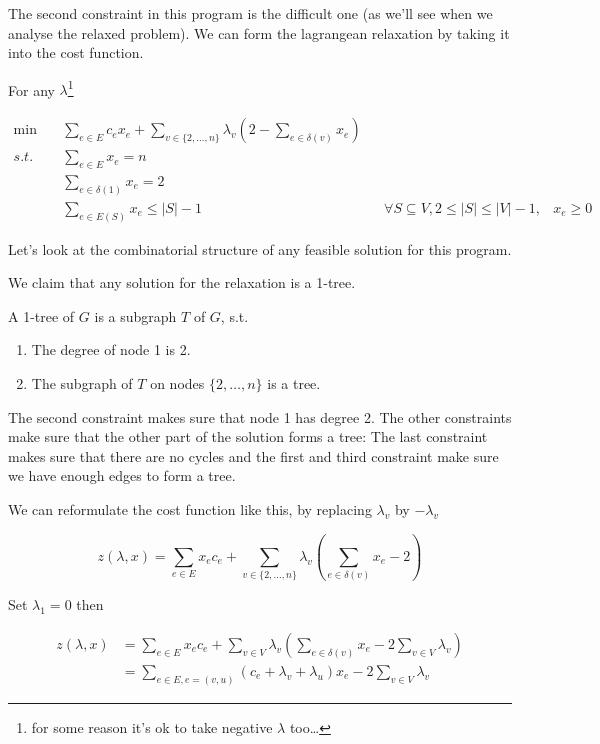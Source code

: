 The second constraint in this program is the difficult one (as we'll see when we analyse the relaxed problem). We can form the lagrangean relaxation by taking it into the cost function.

For any $\lambda$\footnote{for some reason it's ok to take negative $\lambda$ too\ldots}

\begin{align*}
\min \quad & \sum_{e\in E} c_e x_e + \sum_{v\in \{2,\ldots,n\}} \lambda_v(2-\sum_{e\in \delta(v)} x_e)\\
s.t. \quad & \sum_{e\in E} x_e = n\\
	&\sum_{e\in \delta(1)} x_e=2\\
	&\sum_{e\in E(S)} x_e \leq |S|-1 && \forall S \subseteq V, 2\leq |S|\leq |V|-1,
	& x_{e} \geq  0
\end{align*}

Let's look at the combinatorial structure of any feasible solution for this program.

We claim that any solution for the relaxation is a 1-tree.

\begin{Def} A 1-tree of $G$ is a subgraph $T$ of $G$, s.t.
\begin{enumerate}
\item The degree of node 1 is 2.
\item The subgraph of $T$ on nodes $\{2,\ldots,n\}$ is a tree.
\end{enumerate}
\end{Def}

The second constraint makes sure that node 1 has degree 2. The other constraints make sure that the other part of the solution forms a tree: The last constraint makes sure that there are no cycles and the first and third constraint make sure we have enough edges to form a tree.

We can reformulate the cost function like this, by replacing $\lambda_v$ by $-\lambda_v$

\[z(\lambda,x) = \sum_{e\in E} x_ec_e + \sum_{v\in \{2,\ldots,n\}} \lambda_v (\sum_{e\in \delta(v)} x_e-2)\]

Set $\lambda_1=0$ then

\begin{align*}
z(\lambda,x) &= \sum_{e\in E} x_ec_e + \sum_{v\in V} \lambda_v (\sum_{e\in \delta(v)} x_e-2\sum_{v\in V} \lambda_v)\\
	&=\sum_{e\in E, e=(v,u)} (c_e + \lambda_v + \lambda_u)x_e - 2 \sum_{v\in V}\lambda_v
\end{align*}

